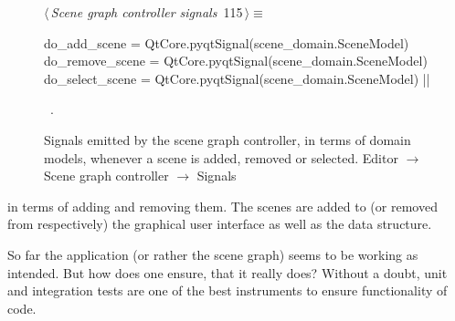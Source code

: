 \documentclass[%
    a4paper,    %
    justified,  %
    nobib,      %
    openany     %
]{tufte-book}
\makeatletter
\renewcommand{\label}[1]{\@tufte@label{##1}}%
\makeatother
\begin{document}
\begin{figure}[!htbp]
\begin{flushleft} \small
\begin{minipage}{\linewidth}\label{scrap53}\raggedright\small
{} $\langle\,${\itshape Scene graph controller signals}\nobreak\ {\footnotesize {115}}$\,\rangle\equiv$
\vspace{-1ex}
\begin{pythoncode}
do_add_scene    = QtCore.pyqtSignal(scene_domain.SceneModel)
do_remove_scene = QtCore.pyqtSignal(scene_domain.SceneModel)
do_select_scene = QtCore.pyqtSignal(scene_domain.SceneModel)
|\NWsep|
\end{pythoncode}
\vspace{1.5ex}
\footnotesize
\begin{list}{}{\setlength{\itemsep}{-\parsep}\setlength{\itemindent}{-\leftmargin}}
\item \NWtxtMacroRefIn\ .

\item{}
\end{list}
\end{minipage}\vspace{4ex}
\end{flushleft}
\caption{Signals emitted by the scene graph controller, in terms of domain
  models, whenever a scene is added, removed or selected.
  \newline{}\newline{}Editor $\rightarrow$ Scene graph controller
  $\rightarrow$ Signals}
\end{figure}


 in terms of adding
and removing them. The scenes are added to (or removed from respectively) the
graphical user interface as well as the data structure.

So far the application (or rather the scene graph) seems to be working as
intended. But how does one ensure, that it really does? Without a doubt, unit
and integration tests are one of the best instruments to ensure functionality of
code.
\end{document}
